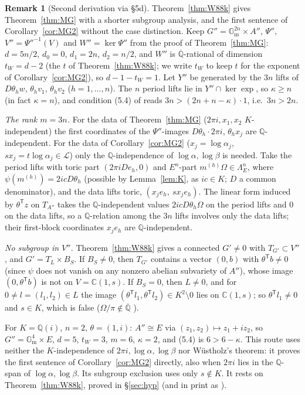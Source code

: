 \documentclass[11pt]{amsart}
\theoremstyle{definition}
\newtheorem{remark}[theorem]{Remark}
\newcommand{\Qb}{\overline{\mathbb{Q}}}
\newcommand{\C}{\mathbb{C}}
\newcommand{\Q}{\mathbb{Q}}
\newcommand{\Gm}{\mathbb{G}_{\mathrm m}}
\newcommand{\Lg}{\mathcal{L}}
\begin{document}
\begin{remark}[Second derivation via \S5d]\label{rem:MG5d}
Theorem~\ref{thm:W88k} gives Theorem~\ref{thm:MG} with a shorter subgroup analysis, and the first sentence of
Corollary~\ref{cor:MG2} without the case distinction. Keep $G''=\Gm^{2n}\times A''$, $\Psi''$, $V''=\Psi''^{-1}(V)$ and
$W''=\ker\Psi''$ from the proof of Theorem~\ref{thm:MG}: $d=5n/2$, $d_0=0$, $d_1=2n$, $d_2=n/2$, and $W''$ is
$\Qb$-rational of dimension $t_W=d-2$ (the $t$ of Theorem~\ref{thm:W88k}; we write $t_W$ to keep $t$ for the exponent of
Corollary~\ref{cor:MG2}), so $d-1-t_W=1$. Let $Y''$ be generated by the $3n$ lifts of $D\theta_hw$,
$\theta_hv_1$, $\theta_hv_2$ ($h=1,\dots,n$). The $n$ period lifts lie in $Y''\cap\ker\exp$, so $\kappa\ge n$ (in fact
$\kappa=n$), and condition (5.4) of \cite{W88} reads $3n>(2n+n-\kappa)\cdot1$, i.e.\ $3n>2n$.

\emph{The rank $m=3n$.} For the data of Theorem~\ref{thm:MG} ($2\pi i,x_1,x_2$ $K$-independent) the first coordinates of
the $\Psi''$-images $D\theta_h\cdot2\pi i$, $\theta_hx_j$ are $\Q$-independent. For the data of Corollary~\ref{cor:MG2}
($x_j=\log\alpha_j$, $sx_j=t\log\alpha_j\in\Lg$) only the $\Q$-independence of $\log\alpha,\log\beta$ is needed. Take the
period lifts with toric part $(2\pi iD e_h,0)$ and $E^n$-part $m^{(h)}\Omega\in\Lambda_E^n$, where
$\psi(m^{(h)})=2icD\theta_h$ (possible by Lemma~\ref{lem:K}, as $ic\in K$; $D$ a common denominator), and the data lifts toric, $(x_je_h,\ sx_je_h)$. The linear form induced
by $\theta^{\mathsf T}z$ on $T_{A''}$ takes the $\Q$-independent values $2icD\theta_h\Omega$ on the period lifts and $0$ on the
data lifts, so a $\Q$-relation among the $3n$ lifts involves only the data lifts; their first-block coordinates $x_je_h$
are $\Q$-independent.

\emph{No subgroup in $V''$.} Theorem~\ref{thm:W88k} gives a connected $G'\ne0$ with $T_{G'}\subset V''$, and $G'=T_L\times
B_S$. If $B_S\ne0$, then $T_{G'}$ contains a vector $(0,b)$ with $\theta^{\mathsf T}b\ne0$ (since $\psi$ does not vanish on any
nonzero abelian subvariety of $A''$), whose image $(0,\theta^{\mathsf T}b)$ is not on $V=\C(1,s)$. If $B_S=0$, then $L\ne0$, and
for $0\ne l=(l_1,l_2)\in L$ the image $(\theta^{\mathsf T}l_1,\theta^{\mathsf T}l_2)\in K^2\setminus0$ lies on $\C(1,s)$; so
$\theta^{\mathsf T}l_1\ne0$ and $s\in K$, which is false ($\Omega/\pi\notin\Qb$ \cite{Ma75}).

For $K=\Q(i)$, $n=2$, $\theta=(1,i)$: $A''\cong E$ via $(z_1,z_2)\mapsto z_1+iz_2$, so $G''=\Gm^4\times E$, $d=5$, $t_W=3$,
$m=6$, $\kappa=2$, and (5.4) is $6>6-\kappa$. This route uses neither the $K$-independence of $2\pi i,\log\alpha,\log\beta$
nor W\"ustholz's theorem: it proves the first sentence of Corollary~\ref{cor:MG2} directly, also when $2\pi i$ lies in the
$\Q$-span of $\log\alpha,\log\beta$. Its subgroup exclusion uses only $s\notin K$. It rests on Theorem~\ref{thm:W88k}, proved in
\S\ref{sec:hyp} (and in print as \cite[\S5d]{W88}).
\end{remark}
\end{document}
